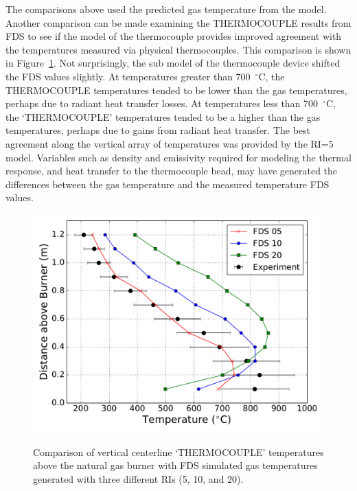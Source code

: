 \documentclass[twoside]{uocthesis}
\begin{document}
{The comparisons above used the predicted gas temperature from the model. Another comparison can be made examining the THERMOCOUPLE results from FDS to see if the model of the thermocouple provides improved agreement with the temperatures measured via physical thermocouples.  This comparison is shown in Figure~\ref{FHNG01_RI_TC}.  Not surprisingly, the sub model of the thermocouple device shifted the FDS values slightly.  At temperatures greater than 700~$^\circ$C, the THERMOCOUPLE temperatures tended to be lower than the gas temperatures, perhaps due to radiant heat transfer losses. At temperatures less than 700~$^\circ$C, the `THERMOCOUPLE' temperatures tended to be a higher than the gas temperatures, perhaps due to gains from radiant heat transfer.  The best agreement along the vertical array of temperatures was provided by the RI=5 model.  Variables such as density and emissivity required for modeling the thermal response, and heat transfer to the thermocouple bead, may have generated the differences between the gas temperature and the measured temperature FDS values.  

\begin{figure}[h]
	\includegraphics[width=5in]{../Figures/FHNG01_RI_TC} \\
	\caption[Comparison of vertical centerline THERMOCOUPLE temperatures above the natural gas burner with FDS simulated gas temperatures.]{Comparison of vertical centerline `THERMOCOUPLE' temperatures above the natural gas burner with FDS simulated gas temperatures generated with three different RIs (5, 10, and 20).}
	\label{FHNG01_RI_TC}
\end{figure}

}
\end{document}
